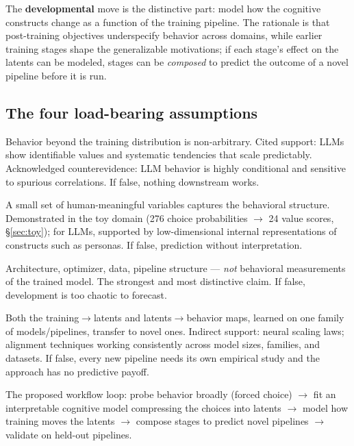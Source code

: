 \documentclass[11pt]{article}
\begin{document}
The \textbf{developmental} move is the distinctive part: model how the cognitive constructs change as a function of the training pipeline. The rationale is that post-training objectives underspecify behavior across domains, while earlier training stages shape the generalizable motivations; if each stage's effect on the latents can be modeled, stages can be \emph{composed} to predict the outcome of a novel pipeline before it is run.

\subsection{The four load-bearing assumptions}
\label{sec:assumptions}

\begin{description}[itemsep=4pt]
\item[A1 --- OOD behavior is structured.] Behavior beyond the training distribution is non-arbitrary. Cited support: LLMs show identifiable values and systematic tendencies that scale predictably. Acknowledged counterevidence: LLM behavior is highly conditional and sensitive to spurious correlations. If false, nothing downstream works.
\item[A2 --- the structure compresses into interpretable latents.] A small set of human-meaningful variables captures the behavioral structure. Demonstrated in the toy domain (276 choice probabilities $\to$ 24 value scores, \S\ref{sec:toy}); for LLMs, supported by low-dimensional internal representations of constructs such as personas. If false, prediction without interpretation.
\item[A3 --- latent evolution is predictable from training information alone.] Architecture, optimizer, data, pipeline structure --- \emph{not} behavioral measurements of the trained model. The strongest and most distinctive claim. If false, development is too chaotic to forecast.
\item[A4 --- the maps generalize across pipelines.] Both the training$\to$latents and latents$\to$behavior maps, learned on one family of models/pipelines, transfer to novel ones. Indirect support: neural scaling laws; alignment techniques working consistently across model sizes, families, and datasets. If false, every new pipeline needs its own empirical study and the approach has no predictive payoff.
\end{description}

The proposed workflow loop: probe behavior broadly (forced choice) $\to$ fit an interpretable cognitive model compressing the choices into latents $\to$ model how training moves the latents $\to$ compose stages to predict novel pipelines $\to$ validate on held-out pipelines.
\end{document}
